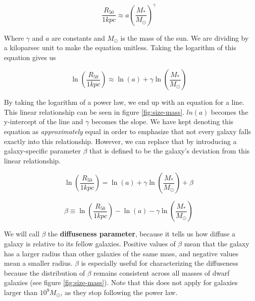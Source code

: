 \begin{equation}
    \frac{R_{50}}{1 kpc} \approx a
    \left(
        \frac{M_*}{M_\odot}
    \right)
    ^{\gamma}
\end{equation}

Where $\gamma$ and $a$ are constants and $M_\odot$ is the mass of the sun. We are dividing by a kiloparsec unit to make the equation unitless. Taking the logarithm of this equation gives us

\begin{equation}
    \ln \left(
        \frac{R_{50}}{1 kpc}
    \right)
    \approx
    \ln(a)
    + \gamma \ln \left(
        \frac{M_*}{M_\odot}
    \right)
\end{equation} \label{equ:linear-rel}

By taking the logarithm of a power law, we end up with an equation for a line. This linear relationship can be seen in figure \ref{fig:size-mass}. $ln(a)$ becomes the y-intercept of the line and $\gamma$ becomes the slope. We have kept denoting this equation as \emph{approximately} equal in order to emphasize that not every galaxy falls exactly into this relationship. However, we can replace that by introducing a galaxy-specific parameter $\beta$ that is defined to be the galaxy's deviation from this linear relationship.

\begin{equation}
    \ln \left(
        \frac{R_{50}}{1 kpc}
    \right)
    =
    \ln(a)
    + \gamma \ln \left(
        \frac{M_*}{M_\odot}
    \right)
    + \beta
\end{equation}

\begin{equation}
    \beta
    \equiv
    \ln \left(
        \frac{R_{50}}{1 kpc}
    \right)
    -
    \ln(a)
    - \gamma \ln \left(
        \frac{M_*}{M_\odot}
    \right)
\end{equation} \label{equ:beta}

We will call $\beta$ the \textbf{diffuseness parameter}, because it tells us how diffuse a galaxy is relative to its fellow galaxies. Positive values of $\beta$ mean that the galaxy has a larger radius than other galaxies of the same mass, and negative values mean a smaller radius. $\beta$ is especially useful for characterizing the diffuseness because the distribution of $\beta$ remains consistent across all masses of dwarf galaxies (see figure \ref{fig:size-mass}). Note that this does not apply for galaxies larger than $10^9 M_\odot$, as they stop following the power law.

